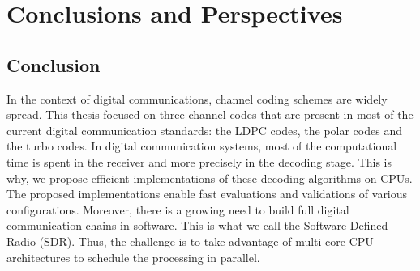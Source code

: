 
\graphicspath{{main/conclusion/fig/}}

\chapter*{Conclusions and Perspectives}

\section*{Conclusion}

In the context of digital communications, channel coding schemes are widely
spread. This thesis focused on three channel codes that are present in most of
the current digital communication standards: the LDPC codes, the polar codes and
the turbo codes. In digital communication systems, most of the computational
time is spent in the receiver and more precisely in the decoding stage. This is
why, we propose efficient implementations of these decoding algorithms on CPUs.
The proposed implementations enable fast evaluations and validations of various
configurations. Moreover, there is a growing need to build full digital
communication chains in software. This is what we call the Software-Defined
Radio (SDR). Thus, the challenge is to take advantage of multi-core CPU
architectures to schedule the processing in parallel.

